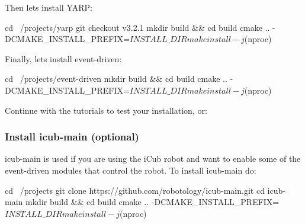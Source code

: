Then let\textquotesingle{}s install {\ttfamily Y\+A\+RP}\+: 
\begin{DoxyCode}
cd ~/projects/yarp
git checkout v3.2.1
mkdir build && cd build
cmake .. -DCMAKE\_INSTALL\_PREFIX=$INSTALL\_DIR
make install -j$(nproc)
\end{DoxyCode}
 Finally, let\textquotesingle{}s install {\ttfamily event-\/driven}\+: 
\begin{DoxyCode}
cd ~/projects/event-driven
mkdir build && cd build
cmake .. -DCMAKE\_INSTALL\_PREFIX=$INSTALL\_DIR
make install -j$(nproc)
\end{DoxyCode}


Continue with the tutorials to test your installation, or\+:

\subsubsection*{Install icub-\/main (optional)}

{\ttfamily icub-\/main} is used if you are using the i\+Cub robot and want to enable some of the {\ttfamily event-\/driven} modules that control the robot. To install {\ttfamily icub-\/main} do\+: 
\begin{DoxyCode}
cd ~/projects
git clone https://github.com/robotology/icub-main.git
cd icub-main
mkdir build && cd build
cmake .. -DCMAKE\_INSTALL\_PREFIX=$INSTALL\_DIR
make install -j$(nproc)
\end{DoxyCode}
 